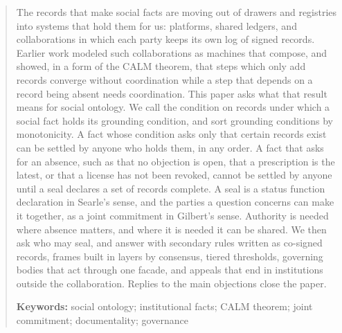 \begin{abstract}
\noindent The records that make social facts are moving out of drawers and registries into systems
that hold them for us: platforms, shared ledgers, and collaborations in which each party keeps its
own log of signed records. Earlier work modeled such collaborations as machines that compose, and
showed, in a form of the CALM theorem, that steps which only add records converge without
coordination while a step that depends on a record being absent needs coordination. This paper asks
what that result means for social ontology. We call the condition on records under which a social
fact holds its grounding condition, and sort grounding conditions by monotonicity. A fact whose
condition asks only that certain records exist can be settled by anyone who holds them, in any
order. A fact that asks for an absence, such as that no objection is open, that a prescription is
the latest, or that a license has not been revoked, cannot be settled by anyone until a seal
declares a set of records complete. A seal is a status function declaration in Searle's sense, and
the parties a question concerns can make it together, as a joint commitment in Gilbert's sense.
Authority is needed where absence matters, and where it is needed it can be shared. We then ask who
may seal, and answer with secondary rules written as co-signed records, frames built in layers by
consensus, tiered thresholds, governing bodies that act through one facade, and appeals that end in
institutions outside the collaboration. Replies to the main objections close the paper.

\medskip\noindent\textbf{Keywords:} social ontology; institutional facts; CALM theorem; joint
commitment; documentality; governance
\end{abstract}
